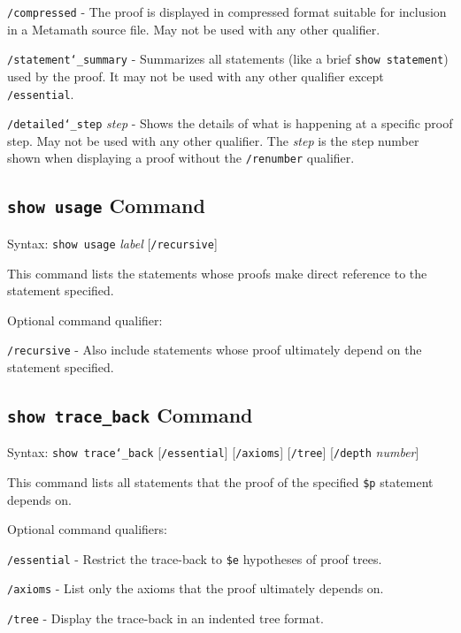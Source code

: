     \texttt{/compressed} - The proof is displayed in compressed format
        suitable for inclusion in a Metamath source file.  May not be used with
        any other qualifier.

    \texttt{/statement{\char`\_}summary} - Summarizes all statements (like a
        brief \texttt{show statement})
        used by the proof.  It may not be used with any other qualifier
        except \texttt{/essential}.

    \texttt{/detailed{\char`\_}step} {\em step} - Shows the details of what is
        happening at
        a specific proof step.  May not be used with any other qualifier.
        The {\em step} is the step number shown when displaying a
        proof without the \texttt{/renumber} qualifier.


\subsection{\texttt{show usage} Command}
Syntax:  \texttt{show usage} {\em label} [\texttt{/recursive}]

This command lists the statements whose proofs make direct reference to
the statement specified.

Optional command qualifier:

    \texttt{/recursive} - Also include statements whose proof ultimately
        depend on the statement specified.



\subsection{\texttt{show trace\_back} Command}
Syntax:  \texttt{show trace{\char`\_}back} [\texttt{/essential}] [\texttt{/axioms}]
    [\texttt{/tree}] [\texttt{/depth} {\em number}]

This command lists all statements that the proof of the specified
\texttt{\$p} statement depends on.

Optional command qualifiers:

    \texttt{/essential} - Restrict the trace-back to \texttt{\$e}
         hypotheses of proof trees.

    \texttt{/axioms} - List only the axioms that the proof ultimately depends on.

    \texttt{/tree} - Display the trace-back in an indented tree format.

